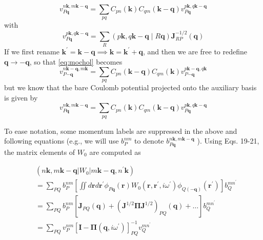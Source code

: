 \begin{equation}
    v_{P\mathbf{q}}^{n \mathbf{k}, m \mathbf{k}-\mathbf{q}} = \sum_{pq} C_{pn}(\mathbf{k}) C_{qm}(\mathbf{k}-\mathbf{q}) v_{P\mathbf{q}}^{p\mathbf{k}, q\mathbf{k}-\mathbf{q}}
\label{eq:mochol}
\end{equation}
with
\begin{equation}
    v_{P\mathbf{q}}^{p\mathbf{k}, q\mathbf{k}-\mathbf{q}} = \sum_R (p\mathbf{k}, q\mathbf{k}-\mathbf{q} \mid R\mathbf{q}) \mathbf{J}_{RP}^{-1/2}(\mathbf{q})
\end{equation}
If we first rename $\mathbf{k^\prime} = \mathbf{k}-\mathbf{q} \implies \mathbf{k} = \mathbf{k^\prime} + \mathbf{q}$, and then we are free to redefine $\mathbf{q} \rightarrow -\mathbf{q}$, so that \ref{eq:mochol} becomes
\begin{equation}
    v_{P\mathbf{-q}}^{n \mathbf{k}-\mathbf{q}, m \mathbf{k}} = \sum_{pq} C_{pn}(\mathbf{k}-\mathbf{q}) C_{qm}(\mathbf{k}) v_{P\mathbf{-q}}^{p\mathbf{k}-\mathbf{q}, q\mathbf{k}}
\end{equation}
but we know that the bare Coulomb potential projected onto the auxiliary basis is given by
\begin{equation}
    v_{P\mathbf{q}}^{n\mathbf{k}, m\mathbf{k}-\mathbf{q}} = \sum_{pq} C_{pn}(\mathbf{k}) C_{qm}(\mathbf{k}-\mathbf{q}) v_{P\mathbf{q}}^{p\mathbf{k}, q\mathbf{k}-\mathbf{q}}
\end{equation}

To ease notation, some momentum labels are suppressed in the above and following equations (e.g., we will use $b_{P}^{n m}$ to denote $b_{P \mathbf{q}}^{n \mathbf{k}, m \mathbf{k}-\mathbf{q}}$ ). Using Eqs. 19-21, the matrix elements of $W_{0}$ are computed as

\begin{align*}
& \left(n \mathbf{k}, m \mathbf{k}-\mathbf{q}\left|W_{0}\right| m \mathbf{k}-\mathbf{q}, n^{\prime} \mathbf{k}\right) \\
& =\sum_{P Q} b_{P}^{n m}\left[\iint d \mathbf{r} d \mathbf{r}^{\prime} \phi_{P \mathbf{q}}(\mathbf{r}) W_{0}\left(\mathbf{r}, \mathbf{r}^{\prime}, i \omega^{\prime}\right) \phi_{Q(-\mathbf{q})}\left(\mathbf{r}^{\prime}\right)\right] b_{Q}^{m n^{\prime}} \\
& =\sum_{P Q} b_{P}^{n m}\left[\mathbf{J}_{P Q}(\mathbf{q})+\left(\mathbf{J}^{1 / 2} \boldsymbol{\Pi} \mathbf{J}^{1 / 2}\right)_{P Q}(\mathbf{q})+\ldots\right] b_{Q}^{m n^{\prime}}  \\
& =\sum_{P Q} v_{P}^{n m}\left[\mathbf{I}-\mathbf{\Pi}\left(\mathbf{q}, i \omega^{\prime}\right)\right]_{P Q}^{-1} v_{Q}^{m n^{\prime}}
\end{align*}

